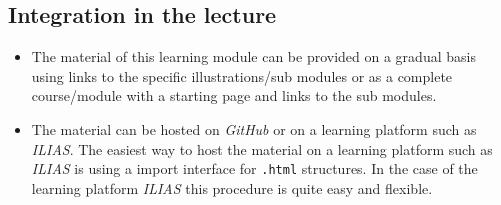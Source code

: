 \documentclass[12pt]{article}
\begin{document}
\subsection{Integration in the lecture}

\begin{itemize}
	\item The material of this learning module can be provided on a gradual basis using links to the specific illustrations/sub modules or as a complete course/module with a starting page and links to the sub modules.
	\item The material can be hosted on \emph{GitHub} or on a learning platform such as \emph{ILIAS}. The easiest way to host the material on a learning platform such as \emph{ILIAS} is using a import interface for \texttt{.html} structures. In the case of the learning platform \emph{ILIAS} this procedure is quite easy and flexible.	
\end{itemize}
\end{document}
